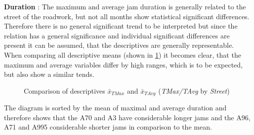 \textbf{Duration} : The maximum and average jam duration is generally related to the street of the roadwork, but not all months show statistical significant differences. Therefore there is no general significant trend to be interpreted but since the relation has a general significance and individual significant differences are present it can be assumed, that the descriptives are generally representable. When comparing all descriptive means (shown in \cref{fig:arbis_summary_Str_temporal}) it becomes clear, that the maximum and average variables differ by high ranges, which is to be expected, but also show a similar tends.
\begin{figure}[ht!]
	\data
	\pgfplotstablesort[sort key=means, sort cmp=float >]{\datasorted}{\data}
	\tiny
	\centering
	\caption{Comparison of descriptives $\bar{x}_{TMax}$ and $\bar{x}_{TAvg}$ (\textit{TMax/TAvg} by \textit{Street})}
	\label{fig:arbis_summary_Str_temporal}
\end{figure}
The diagram is sorted by the mean of maximal and average duration and therefore shows that the A70 and A3 have considerable longer jams and the A96, A71 and A995 considerable shorter jams in comparison to the mean. 

